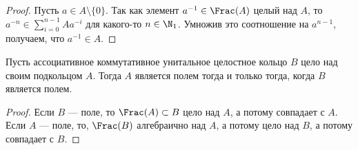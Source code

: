 \documentclass[
	extrafontsizes,
	11pt,
	hyphens,
]{memoir}
\begin{document}
\begin{proof}
Пусть \(a \in A \setminus \{0\}\).
Так как элемент \(a^{-1} \in \Frac(A)\) целый над \(A\), то \(a^{-n} \in \sum_{i=0}^{n-1} A a^{-i}\) для какого-то \(n \in \N_1\).
Умножив это соотношение на \(a^{n-1}\), получаем, что \(a^{-1} \in A\).
\end{proof}

\begin{theorem}
Пусть ассоциативное коммутативное унитальное целостное кольцо \(B\) цело над своим подкольцом \(A\).
\label{thm:hilbert_1}
Тогда \(A\) является полем тогда и только тогда, когда \(B\) является полем.
\end{theorem}

\begin{proof}
Если \(B\) --- поле, то \(\Frac(A) \subset B\) цело над \(A\), а потому совпадает с \(A\).
Если \(A\) --- поле, то, \(\Frac(B)\) алгебраично над \(A\), а потому цело над \(B\), а потому совпадает с \(B\).
\end{proof}

%
%
%
%
\end{document}
